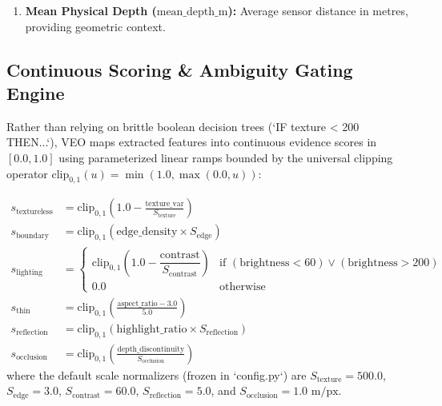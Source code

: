 \documentclass[11pt,a4paper]{article}
\begin{document}
\begin{enumerate}
    \begin{equation}
    \label{eq:feat_discontinuity}
    \text{depth\_discontinuity} = \frac{1}{|\partial R_k \cap \mathcal{M}_{\mathrm{eval}}|} \sum_{(x,y) \in \partial R_k \cap \mathcal{M}_{\mathrm{eval}}} \sqrt{g_x(x,y)^2 + g_y(x,y)^2}
    \end{equation}
    where $g_x, g_y = \nabla D_{\mathrm{gt}}$ are the spatial gradients of ground-truth depth.
    \item \textbf{Mean Physical Depth ($\text{mean\_depth\_m}$):} Average sensor distance in metres, providing geometric context.
\end{enumerate}

\subsection{Continuous Scoring & Ambiguity Gating Engine}
\label{sec:scoring}
Rather than relying on brittle boolean decision trees (`IF texture < 200 THEN...`), VEO maps extracted features into continuous evidence scores in $[0.0, 1.0]$ using parameterized linear ramps bounded by the universal clipping operator $\text{clip}_{0,1}(u) = \min(1.0, \max(0.0, u))$:

\begin{align}
\label{eq:scores}
s_{\mathrm{textureless}} &= \text{clip}_{0,1}\left( 1.0 - \frac{\text{texture\_var}}{S_{\mathrm{texture}}} \right) \\[0.4em]
s_{\mathrm{boundary}} &= \text{clip}_{0,1}\left( \text{edge\_density} \times S_{\mathrm{edge}} \right) \\[0.4em]
s_{\mathrm{lighting}} &= \begin{cases}
\text{clip}_{0,1}\left( 1.0 - \dfrac{\text{contrast}}{S_{\mathrm{contrast}}} \right) & \text{if } (\text{brightness} < 60) \lor (\text{brightness} > 200) \\[0.4em]
0.0 & \text{otherwise}
\end{cases} \\[0.4em]
s_{\mathrm{thin}} &= \text{clip}_{0,1}\left( \frac{\text{aspect\_ratio} - 3.0}{5.0} \right) \\[0.4em]
s_{\mathrm{reflection}} &= \text{clip}_{0,1}\left( \text{highlight\_ratio} \times S_{\mathrm{reflection}} \right) \\[0.4em]
s_{\mathrm{occlusion}} &= \text{clip}_{0,1}\left( \frac{\text{depth\_discontinuity}}{S_{\mathrm{occlusion}}} \right)
\end{align}
where the default scale normalizers (frozen in `config.py`) are $S_{\mathrm{texture}} = 500.0$, $S_{\mathrm{edge}} = 3.0$, $S_{\mathrm{contrast}} = 60.0$, $S_{\mathrm{reflection}} = 5.0$, and $S_{\mathrm{occlusion}} = 1.0\text{ m/px}$.
\end{document}
